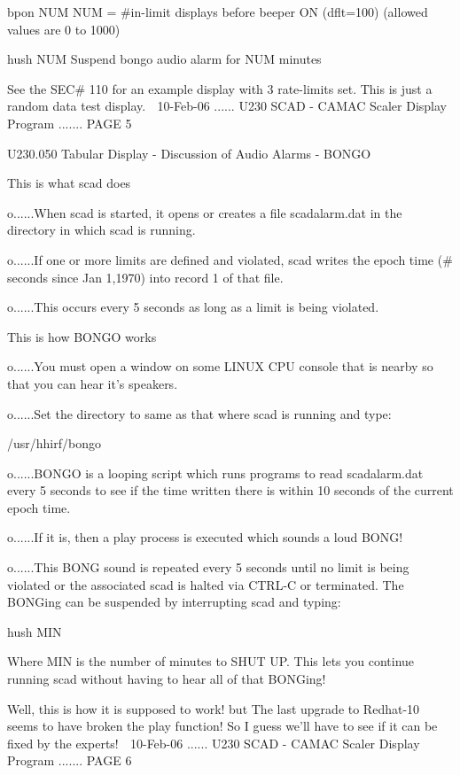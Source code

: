   bpon NUM         NUM = #in-limit displays before beeper ON (dflt=100)
                    (allowed values are 0 to 1000)
 
   hush NUM         Suspend bongo audio alarm for NUM minutes
 
   See  the  SEC#  110  for an example display with 3 rate-limits set. This is
   just a random data test display.
    
   10-Feb-06 ...... U230  SCAD - CAMAC Scaler Display Program ....... PAGE   5
 
 
 
   U230.050  Tabular Display - Discussion of Audio Alarms - BONGO
 
   This is what scad does
 
   o......When scad is started, it opens or creates a  file  scadalarm.dat  in
          the directory in which scad is running.
 
   o......If  one  or  more  limits  are defined and violated, scad writes the
          epoch time (# seconds since Jan 1,1970) into record 1 of that file.
 
   o......This occurs every 5 seconds as long as a limit is being violated.
 
   This is how BONGO works
 
   o......You must open a window on some LINUX CPU console that is  nearby  so
          that you can hear it's speakers.
 
   o......Set the directory to same as that where scad is running and type:
 
   /usr/hhirf/bongo
 
   o......BONGO  is a looping script which runs programs to read scadalarm.dat
          every 5 seconds to see if  the  time  written  there  is  within  10
          seconds of the current epoch time.
 
   o......If it is, then a play process is executed which sounds a loud BONG!
 
   o......This  BONG sound is repeated every 5 seconds until no limit is being
          violated or the associated scad is halted via CTRL-C or  terminated.
          The BONGing can be suspended by interrupting scad and typing:
 
   hush MIN
 
          Where  MIN  is  the  number  of  minutes  to  SHUT UP. This lets you
          continue running scad without having to hear all of that BONGing!
 
                    Well, this is how it is supposed to work!
                                       but
      The last upgrade to Redhat-10 seems to have broken the play function!
         So I guess we'll have to see if it can be fixed by the experts!
    
   10-Feb-06 ...... U230  SCAD - CAMAC Scaler Display Program ....... PAGE   6
 
